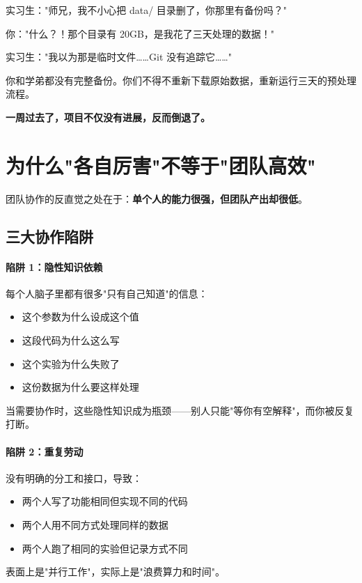 实习生："师兄，我不小心把 data/ 目录删了，你那里有备份吗？"

你："什么？！那个目录有 20GB，是我花了三天处理的数据！"

实习生："我以为那是临时文件……Git 没有追踪它……"

你和学弟都没有完整备份。你们不得不重新下载原始数据，重新运行三天的预处理流程。

\textbf{一周过去了，项目不仅没有进展，反而倒退了。}

\section{为什么"各自厉害"不等于"团队高效"}

团队协作的反直觉之处在于：\textbf{单个人的能力很强，但团队产出却很低}。

\subsection{三大协作陷阱}

\paragraph{陷阱 1：隐性知识依赖}

每个人脑子里都有很多"只有自己知道"的信息：
\begin{itemize}
  \item 这个参数为什么设成这个值
  \item 这段代码为什么这么写
  \item 这个实验为什么失败了
  \item 这份数据为什么要这样处理
\end{itemize}

当需要协作时，这些隐性知识成为瓶颈——别人只能"等你有空解释"，而你被反复打断。

\paragraph{陷阱 2：重复劳动}

没有明确的分工和接口，导致：
\begin{itemize}
  \item 两个人写了功能相同但实现不同的代码
  \item 两个人用不同方式处理同样的数据
  \item 两个人跑了相同的实验但记录方式不同
\end{itemize}

表面上是"并行工作"，实际上是"浪费算力和时间"。

